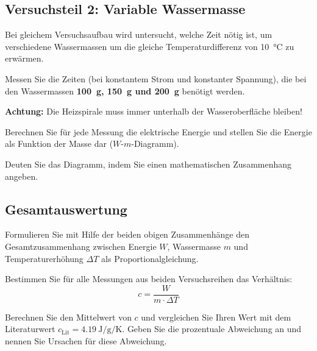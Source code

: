 \documentclass[11pt,a4paper]{scrartcl}
\begin{document}
	\subsection*{Versuchsteil 2: Variable Wassermasse}
	
	Bei gleichem Versuchsaufbau wird untersucht, welche Zeit nötig ist, um verschiedene Wassermassen um die gleiche Temperaturdifferenz von \SI{10}{\celsius} zu erwärmen.
	
	\begin{aufgabe}[title={\faIcon{pencil-alt} Aufgabe 2.1: Messung}]
		Messen Sie die Zeiten (bei konstantem Strom und konstanter Spannung), die bei den Wassermassen \textbf{\SI{100}{\gram}, \SI{150}{\gram} und \SI{200}{\gram}} benötigt werden.
		
		\textbf{Achtung:} Die Heizspirale muss immer unterhalb der Wasseroberfläche bleiben!
	\end{aufgabe}
	
	\begin{aufgabe}[title={\faIcon{pencil-alt} Aufgabe 2.2: Berechnung und Darstellung}]
		Berechnen Sie für jede Messung die elektrische Energie und stellen Sie die Energie als Funktion der Masse dar ($W$-$m$-Diagramm).
	\end{aufgabe}
	
	\begin{aufgabe}[title={\faIcon{pencil-alt} Aufgabe 2.3: Interpretation}]
		Deuten Sie das Diagramm, indem Sie einen mathematischen Zusammenhang angeben.
	\end{aufgabe}
	
	\subsection*{Gesamtauswertung}
	
	\begin{aufgabe}[title={\faIcon{pencil-alt} Aufgabe 3.1: Gesamtzusammenhang}]
		Formulieren Sie mit Hilfe der beiden obigen Zusammenhänge den Gesamtzusammenhang zwischen Energie $W$, Wassermasse $m$ und Temperaturerhöhung $\Delta T$ als Proportionalgleichung.
	\end{aufgabe}
	
	\begin{aufgabe}[title={\faIcon{pencil-alt} Aufgabe 3.2: Bestimmung der Wärmekapazität}]
		Bestimmen Sie für alle Messungen aus beiden Versuchsreihen das Verhältnis:
		\[c = \frac{W}{m \cdot \Delta T}\]
	\end{aufgabe}
	
	\begin{sternaufgabe}[title={\faIcon{star} Aufgabe 3.3: Vergleich mit Literaturwert}]
		Berechnen Sie den Mittelwert von $c$ und vergleichen Sie Ihren Wert mit dem Literaturwert $c_{\text{Lit}} = \SI{4,19}{\joule\per\gram\per\kelvin}$. Geben Sie die prozentuale Abweichung an und nennen Sie Ursachen für diese Abweichung.
	\end{sternaufgabe}
	
\end{document}
